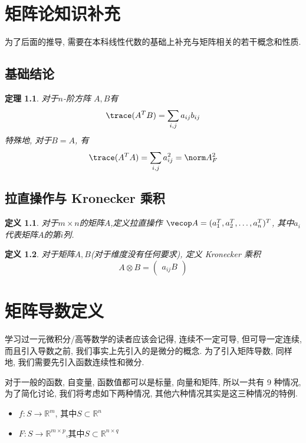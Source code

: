 \documentclass{ctexbook}
\newtheorem{definition}{定义}
\newtheorem{theorem}{定理}
\begin{document}
\chapter{矩阵论知识补充}
为了后面的推导, 需要在本科线性代数的基础上补充与矩阵相关的若干概念和性质.
\section{基础结论}

\begin{theorem}
	 对于$n$-阶方阵 $A,B$有
	 \begin{equation*}
  \trace (A^TB) = \sum_{i,j}a_{ij}b_{ij}
\end{equation*}
  特殊地, 对于$B=A$, 有
  \begin{equation*}
  \trace (A^TA) = \sum_{i,j}a_{ij}^2 = \norm A_F^2
\end{equation*}






\end{theorem}


\section{拉直操作与 Kronecker 乘积}
\begin{definition}
	对于$m\times n$的矩阵$A$,定义拉直操作 $\vecop A= (a_1^T, a_2^T,\dots, a_n^T)^T$, 其中$a_i$代表矩阵$A$的第$i$列.
\end{definition}

\begin{definition}
	对于矩阵$A, B$(对于维度没有任何要求), 定义 Kronecker 乘积 
	\begin{equation*}
  A\otimes B = 
  \begin{pmatrix}
  	a_{ij}B
  \end{pmatrix}
\end{equation*}

\end{definition}

\chapter{矩阵导数定义}
学习过一元微积分/高等数学的读者应该会记得, 连续不一定可导, 但可导一定连续, 而且引入导数之前, 我们事实上先引入的是微分的概念. 为了引入矩阵导数, 同样地, 我们需要先引入函数连续性和微分. 

对于一般的函数, 自变量, 函数值都可以是标量, 向量和矩阵, 所以一共有 9 种情况, 为了简化讨论, 我们将考虑如下两种情况, 其他六种情况其实是这三种情况的特例.
\begin{itemize}
  \item $f : S \rightarrow \mathbb R^m$, 其中$S\subset \mathbb R^n$
  \item $F : S\rightarrow \mathbb R^{m\times p}$,其中$S\subset \mathbb R^{n\times q}$
\end{itemize}
\end{document}
